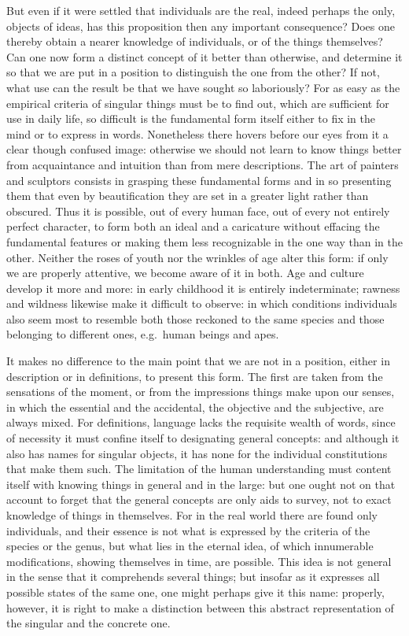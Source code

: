 \documentclass[12pt,a4paper,openany]{book}
\newcommand{\opage}[1]{\marginnote{\footnotesize\textit{[#1]}}}
\begin{document}
But even if it were settled that individuals are the real, indeed perhaps the only,
objects of ideas, has this proposition then any important consequence? Does one
thereby obtain a nearer knowledge of individuals, or of the things themselves? Can
one now form a distinct concept of it better than otherwise, and determine it so
that we are put in a position to distinguish the one from the other? If not, what
use can the result be that we have sought so laboriously? For as easy as the
empirical criteria of singular things must be to find out, which are sufficient for
use in daily life, so difficult is the fundamental form itself either to fix in the
mind or to express in words. Nonetheless there hovers before our eyes from it a
clear though confused image: otherwise we should not learn to know things better
from acquaintance and intuition than from mere descriptions. The art of painters
and sculptors consists in grasping these fundamental forms and in so presenting them
that even by beautification they are set in a greater light rather than obscured.
Thus it is possible, out of every human face, out of every not entirely perfect
character, to form both an ideal and a caricature without effacing the fundamental
features or making them less recognizable in the one way than in the other. Neither
the roses of youth nor the wrinkles of age alter this form: if only we are properly
attentive, we become aware of it in both. Age and culture develop it more and more:
in early childhood it is entirely indeterminate; rawness and wildness likewise make
it difficult to observe: in which conditions individuals also seem most to resemble
both those reckoned to the same species and those belonging to different ones, e.g.\
human beings and apes.

It makes no difference to the main point that we are not in a position,
\setcounter{footnote}{0}%
\opage{108}either in description or in definitions, to present this form. The first are taken
from the sensations of the moment, or from the impressions things make upon our
senses, in which the essential and the accidental, the objective and the subjective,
are always mixed. For definitions, language lacks the requisite wealth of words,
since of necessity it must confine itself to designating general concepts: and
although it also has names for singular objects, it has none for the individual
constitutions that make them such. The limitation of the human understanding must
content itself with knowing things in general and in the large: but one ought not
on that account to forget that the general concepts are only aids to survey, not to
exact knowledge of things in themselves. For in the real world there are found only
individuals, and their essence is not what is expressed by the criteria of the
species or the genus, but what lies in the eternal idea, of which innumerable
modifications, showing themselves in time, are possible. This idea is not general in
the sense that it comprehends several things; but insofar as it expresses all
possible states of the same one, one might perhaps give it this name: properly,
however, it is right to make a distinction between this abstract representation of
the singular and the concrete one.
\end{document}
